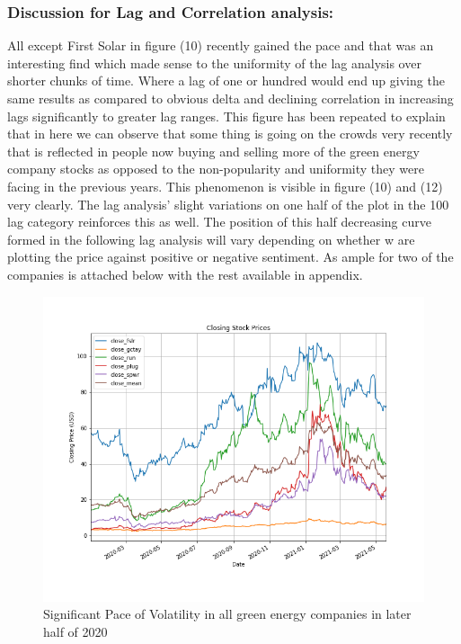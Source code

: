 \documentclass[sigconf, nonacm]{acmart}
\begin{document}
\subsubsection{Discussion for Lag and Correlation analysis:}
All except First Solar in figure (10) recently gained the pace and that was an interesting find which made sense to the uniformity of the lag analysis over shorter chunks of time. Where a lag of one or hundred would end up giving the same results as compared to obvious delta and declining correlation in increasing lags significantly to greater lag ranges.
This figure has been repeated to explain that in here we can observe that some thing is going on the crowds very recently that is reflected in people now buying and selling more of the green energy company stocks as opposed to the non-popularity and uniformity they were facing in the previous years. This phenomenon is visible in figure (10) and (12) very clearly. The lag analysis' slight variations on one half of the plot in the 100 lag category reinforces this as well. The position of this half decreasing curve formed in the following lag analysis will vary depending on whether w are plotting the price against positive or negative sentiment. As ample for two of the companies is attached below with the rest available in appendix.
\begin{figure}[H]
  \centering
  \includegraphics[width=\linewidth]{all_stock_prices_and_mean/all_stock_prices_2020_2021.png}
  \caption{Significant Pace of Volatility in all green energy companies in later half of 2020}
\end{figure}
\end{document}
